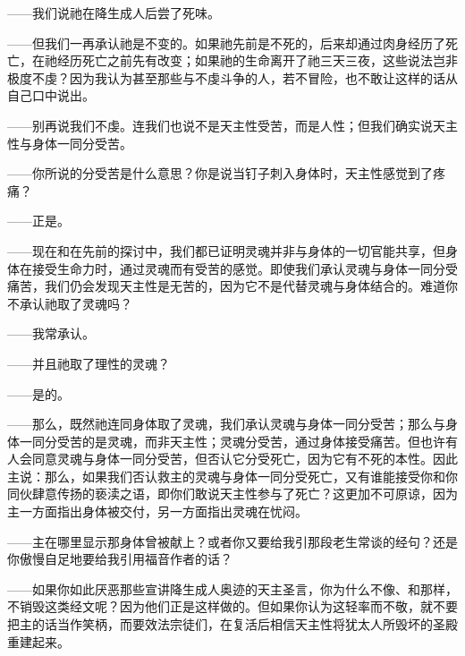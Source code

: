 ——我们说祂在降生成人后尝了死味。\par

——但我们一再承认祂是不变的。如果祂先前是不死的，后来却通过肉身经历了死亡，在祂经历死亡之前先有改变；如果祂的生命离开了祂三天三夜，这些说法岂非极度不虔？因为我认为甚至那些与不虔斗争的人，若不冒险，也不敢让这样的话从自己口中说出。\par

——别再说我们不虔。连我们也说不是天主性受苦，而是人性；但我们确实说天主性与身体一同分受苦。\par

——你所说的分受苦是什么意思？你是说当钉子刺入身体时，天主性感觉到了疼痛？\par

——正是。\par

——现在和在先前的探讨中，我们都已证明灵魂并非与身体的一切官能共享，但身体在接受生命力时，通过灵魂而有受苦的感觉。即使我们承认灵魂与身体一同分受痛苦，我们仍会发现天主性是无苦的，因为它不是代替灵魂与身体结合的。难道你不承认祂取了灵魂吗？\par

——我常承认。\par

——并且祂取了理性的灵魂？\par

——是的。\par

——那么，既然祂连同身体取了灵魂，我们承认灵魂与身体一同分受苦；那么与身体一同分受苦的是灵魂，而非天主性；灵魂分受苦，通过身体接受痛苦。但也许有人会同意灵魂与身体一同分受苦，但否认它分受死亡，因为它有不死的本性。因此主说：那么，如果我们否认救主的灵魂与身体一同分受死亡，又有谁能接受你和你同伙肆意传扬的亵渎之语，即你们敢说天主性参与了死亡？这更加不可原谅，因为主一方面指出身体被交付，另一方面指出灵魂在忧闷。\par

——主在哪里显示那身体曾被献上？或者你又要给我引那段老生常谈的经句？还是你傲慢自足地要给我引用福音作者的话？\par

——如果你如此厌恶那些宣讲降生成人奥迹的天主圣言，你为什么不像、和那样，不销毁这类经文呢？因为他们正是这样做的。但如果你认为这轻率而不敬，就不要把主的话当作笑柄，而要效法宗徒们，在复活后相信天主性将犹太人所毁坏的圣殿重建起来。\par


